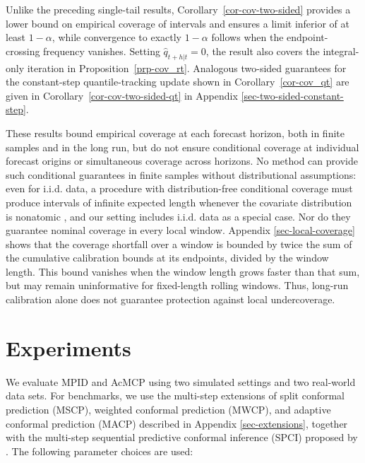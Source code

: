 \documentclass[
  american,
  12pt]{article}
\theoremstyle{plain}
\theoremstyle{plain}
\theoremstyle{remark}
\begin{document}
Unlike the preceding single-tail results,
Corollary~\ref{cor-cov-two-sided} provides a lower bound on empirical
coverage of intervals and ensures a limit inferior of at least
\(1-\alpha\), while convergence to exactly \(1-\alpha\) follows when the
endpoint-crossing frequency vanishes. Setting \(\hat q_{t+h|t}=0\), the
result also covers the integral-only iteration in
Proposition~\ref{prp-cov_rt}. Analogous two-sided guarantees for the
constant-step quantile-tracking update shown in
Corollary~\ref{cor-cov_qt} are given in
Corollary~\ref{cor-cov-two-sided-qt} in Appendix
\ref{sec-two-sided-constant-step}.

These results bound empirical coverage at each forecast horizon, both in
finite samples and in the long run, but do not ensure conditional
coverage at individual forecast origins or simultaneous coverage across
horizons. No method can provide such conditional guarantees in finite
samples without distributional assumptions: even for i.i.d. data, a
procedure with distribution-free conditional coverage must produce
intervals of infinite expected length whenever the covariate
distribution is nonatomic \citep{lei2014, barber2021limits}, and our
setting includes i.i.d. data as a special case. Nor do they guarantee
nominal coverage in every local window. Appendix
\ref{sec-local-coverage} shows that the coverage shortfall over a window
is bounded by twice the sum of the cumulative calibration bounds at its
endpoints, divided by the window length. This bound vanishes when the
window length grows faster than that sum, but may remain uninformative
for fixed-length rolling windows. Thus, long-run calibration alone does
not guarantee protection against local undercoverage.

\section{Experiments}\label{sec-experiments}

We evaluate MPID and AcMCP using two simulated settings and two
real-world data sets. For benchmarks, we use the multi-step extensions
of split conformal prediction (MSCP), weighted conformal prediction
(MWCP), and adaptive conformal prediction (MACP) described in Appendix
\ref{sec-extensions}, together with the multi-step sequential predictive
conformal inference (SPCI) proposed by \citet{xu2023}. The following
parameter choices are used:
\end{document}
